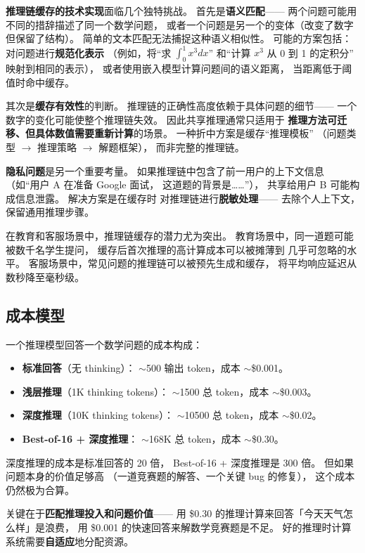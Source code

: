 \textbf{推理链缓存的技术实现}面临几个独特挑战。
首先是\textbf{语义匹配}——
两个问题可能用不同的措辞描述了同一个数学问题，
或者一个问题是另一个的变体（改变了数字但保留了结构）。
简单的文本匹配无法捕捉这种语义相似性。
可能的方案包括：
对问题进行\textbf{规范化表示}
（例如，将“求 $\int_0^1 x^3 dx$”
和“计算 $x^3$ 从 0 到 1 的定积分”
映射到相同的表示），
或者使用嵌入模型计算问题间的语义距离，
当距离低于阈值时命中缓存。

其次是\textbf{缓存有效性}的判断。
推理链的正确性高度依赖于具体问题的细节——
一个数字的变化可能使整个推理链失效。
因此共享推理通常只适用于
\textbf{推理方法可迁移、但具体数值需要重新计算}的场景。
一种折中方案是缓存“推理模板”
（问题类型 $\to$ 推理策略 $\to$ 解题框架），
而非完整的推理链。

\textbf{隐私问题}是另一个重要考量。
如果推理链中包含了前一用户的上下文信息
（如“用户 A 在准备 Google 面试，
这道题的背景是……”），
共享给用户 B 可能构成信息泄露。
解决方案是在缓存时
对推理链进行\textbf{脱敏处理}——
去除个人上下文，保留通用推理步骤。

在教育和客服场景中，推理链缓存的潜力尤为突出。
教育场景中，同一道题可能被数千名学生提问，
缓存后首次推理的高计算成本可以被摊薄到
几乎可忽略的水平。
客服场景中，常见问题的推理链可以被预先生成和缓存，
将平均响应延迟从数秒降至毫秒级。

\subsection{成本模型}

一个推理模型回答一个数学问题的成本构成：
\begin{itemize}[noitemsep]
  \item \textbf{标准回答}（无 thinking）：
        $\sim$500 输出 token，成本 $\sim$\$0.001。
  \item \textbf{浅层推理}（1K thinking tokens）：
        $\sim$1500 总 token，成本 $\sim$\$0.003。
  \item \textbf{深度推理}（10K thinking tokens）：
        $\sim$10500 总 token，成本 $\sim$\$0.02。
  \item \textbf{Best-of-16 + 深度推理}：
        $\sim$168K 总 token，成本 $\sim$\$0.30。
\end{itemize}

深度推理的成本是标准回答的 20 倍，
Best-of-16 + 深度推理是 300 倍。
但如果问题本身的价值足够高
（一道竞赛题的解答、一个关键 bug 的修复），
这个成本仍然极为合算。

关键在于\textbf{匹配推理投入和问题价值}——
用 \$0.30 的推理计算来回答「今天天气怎么样」是浪费，
用 \$0.001 的快速回答来解数学竞赛题是不足。
好的推理时计算系统需要\textbf{自适应}地分配资源。



